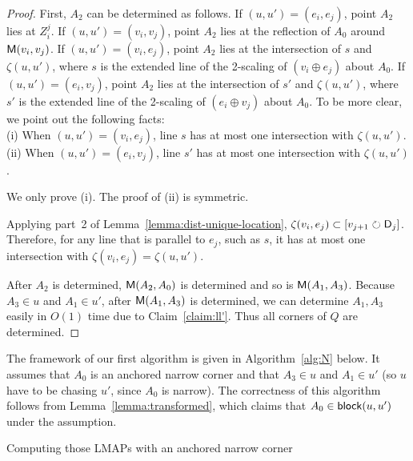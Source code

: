 \documentclass{ws-ijcga}
\begin{document}
\begin{proof}
First, $A_2$ can be determined as follows.
If $(u,u')=(e_i,e_j)$, point $A_2$ lies at $Z_i^j$.
If $(u,u')=(v_i,v_j)$, point $A_2$ lies at the reflection of $A_0$ around $\mathsf{M}(v_i,v_j)$.
If $(u,u')=(v_i,e_j)$, point $A_2$ lies at the intersection of $s$ and $\zeta(u,u')$, where $s$ is the extended line of the 2-scaling of $(v_i\oplus e_j)$ about $A_0$.
If $(u,u')=(e_i,v_j)$, point $A_2$ lies at the intersection of $s'$ and $\zeta(u,u')$, where $s'$ is the extended line of the 2-scaling of $(e_i\oplus v_j)$ about $A_0$.
To be more clear, we point out the following facts:\\
\quad (i) When $(u,u')=(v_i,e_j)$, line $s$ has at most one intersection with $\zeta(u,u')$.\\
\quad (ii) When $(u,u')=(e_i,v_j)$, line $s'$ has at most one intersection with $\zeta(u,u')$.

\smallskip We only prove (i). The proof of (ii) is symmetric.

Applying part~2 of Lemma~\ref{lemma:dist-unique-location},  $\zeta(v_i,e_j)\subset [v_{j+1}\circlearrowright \mathsf{D}_j]$.
Therefore, for any line that is parallel to $e_j$, such as $s$, it has at most one intersection with $\zeta(v_i,e_j)=\zeta(u,u')$.

\smallskip After $A_2$ is determined, $\mathsf{M}(A_2,A_0)$ is determined and so is $\mathsf{M}(A_1,A_3)$.
Because $A_3\in u$ and $A_1\in u'$, after $\mathsf{M}(A_1,A_3)$ is determined, we can determine $A_1,A_3$ easily in $O(1)$ time due to Claim~\ref{claim:ll'}.
Thus all corners of $Q$ are determined.
 \end{proof}

The framework of our first algorithm is given in Algorithm~\ref{alg:N} below.
It assumes that $A_0$ is an anchored narrow corner and that $A_3\in u$ and $A_1\in u'$
  (so $u$ have to be chasing $u'$, since $A_0$ is narrow).
The correctness of this algorithm follows from Lemma~\ref{lemma:transformed}, which claims that $A_0\in \mathsf{block}(u,u')$ under the assumption.

\begin{algorithm}[h]
\caption{Computing those LMAPs with an anchored narrow corner}\label{alg:N}
\end{algorithm}
\end{document}

